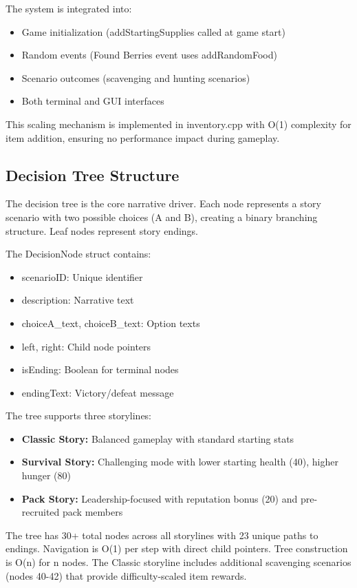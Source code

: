 \documentclass[12pt,a4paper]{article}
\begin{document}
\vspace{0.3cm}

The system is integrated into:
\begin{itemize}
	\item Game initialization (addStartingSupplies called at game start)
	\item Random events (Found Berries event uses addRandomFood)
	\item Scenario outcomes (scavenging and hunting scenarios)
	\item Both terminal and GUI interfaces
\end{itemize}

This scaling mechanism is implemented in inventory.cpp with O(1) complexity for item addition, ensuring no performance impact during gameplay.

\subsection{Decision Tree Structure}
The decision tree is the core narrative driver. Each node represents a story scenario with two possible choices (A and B), creating a binary branching structure. Leaf nodes represent story endings.

The DecisionNode struct contains:
\begin{itemize}
	\item scenarioID: Unique identifier
	\item description: Narrative text
	\item choiceA\_text, choiceB\_text: Option texts
	\item left, right: Child node pointers
	\item isEnding: Boolean for terminal nodes
	\item endingText: Victory/defeat message
\end{itemize}

The tree supports three storylines:
\begin{itemize}
	\item \textbf{Classic Story:} Balanced gameplay with standard starting stats
	\item \textbf{Survival Story:} Challenging mode with lower starting health (40), higher hunger (80)
	\item \textbf{Pack Story:} Leadership-focused with reputation bonus (20) and pre-recruited pack members
\end{itemize}

The tree has 30+ total nodes across all storylines with 23 unique paths to endings. Navigation is O(1) per step with direct child pointers. Tree construction is O(n) for n nodes. The Classic storyline includes additional scavenging scenarios (nodes 40-42) that provide difficulty-scaled item rewards.
\end{document}
